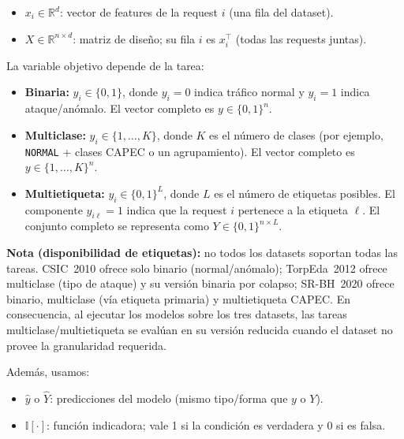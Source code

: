 \documentclass[12pt,oneside]{report}
\newcommand{\R}{\mathbb{R}}
\newcommand{\ind}{\mathbb{I}} %
\begin{document}
\begin{itemize}[leftmargin=*]
  \item $x_i \in \R^d$: vector de features de la request $i$ (una fila del dataset).
  \item $X \in \R^{n \times d}$: matriz de diseño; su fila $i$ es $x_i^\top$ (todas las requests juntas).
\end{itemize}

La variable objetivo depende de la tarea:

\begin{itemize}[leftmargin=*]
  \item \textbf{Binaria:} $y_i \in \{0,1\}$, donde $y_i=0$ indica tráfico normal y $y_i=1$ indica ataque/anómalo.
        El vector completo es $y \in \{0,1\}^n$.
  \item \textbf{Multiclase:} $y_i \in \{1,\dots,K\}$, donde $K$ es el número de clases (por ejemplo, \texttt{NORMAL} + clases CAPEC o un agrupamiento).
        El vector completo es $y \in \{1,\dots,K\}^n$.
  \item \textbf{Multietiqueta:} $y_i \in \{0,1\}^L$, donde $L$ es el número de etiquetas posibles.
        El componente $y_{i\ell}=1$ indica que la request $i$ pertenece a la etiqueta $\ell$.
        El conjunto completo se representa como $Y \in \{0,1\}^{n \times L}$.
\end{itemize}

\noindent\textbf{Nota (disponibilidad de etiquetas):} no todos los datasets soportan todas las tareas. CSIC~2010 ofrece solo binario (normal/anómalo); TorpEda~2012 ofrece multiclase (tipo de ataque) y su versión binaria por colapso; SR-BH~2020 ofrece binario, multiclase (vía etiqueta primaria) y multietiqueta CAPEC. En consecuencia, al ejecutar los modelos sobre los tres datasets, las tareas multiclase/multietiqueta se evalúan en su versión reducida cuando el dataset no provee la granularidad requerida.

Además, usamos:

\begin{itemize}[leftmargin=*]
  \item $\hat{y}$ o $\hat{Y}$: predicciones del modelo (mismo tipo/forma que $y$ o $Y$).
  \item $\ind[\cdot]$: función indicadora; vale 1 si la condición es verdadera y 0 si es falsa.
\end{itemize}
\end{document}
